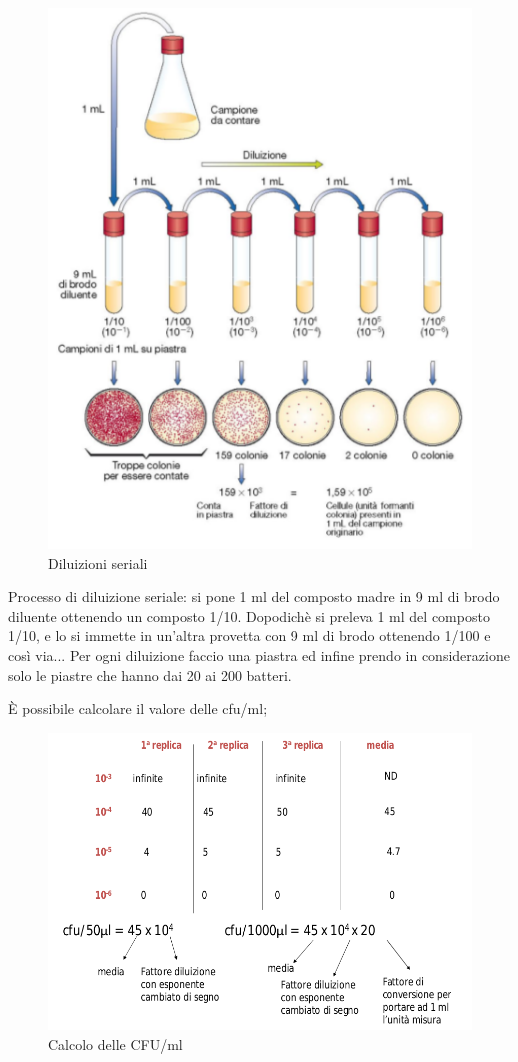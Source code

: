 \documentclass[11pt]{book}
\begin{document}
\begin{itemize}
\begin{enumerate}
\clearpage
\begin{figure}[htp]
\centering
\includegraphics[scale=0.4]{img/Diluizioni seriali.png}
\caption{Diluizioni seriali}
\label{}
\end{figure}

Processo di diluizione seriale: si pone 1 ml del composto madre in 9 ml di brodo diluente ottenendo un composto 1/10. Dopodichè si preleva 1 ml del composto 1/10, e lo si immette in un’altra provetta con 9 ml di brodo ottenendo 1/100 e così via...
Per ogni diluizione faccio una piastra ed infine prendo in considerazione solo le piastre che hanno dai 20 ai 200 batteri.

\`E possibile calcolare il valore delle cfu/ml;

\begin{figure}[htp]
\centering
\includegraphics[scale=0.29]{img/Calcolo cfu-ml.png}
\caption{Calcolo delle CFU/ml}
\label{}
\end{figure}


\end{enumerate}
\end{itemize}
\end{document}
